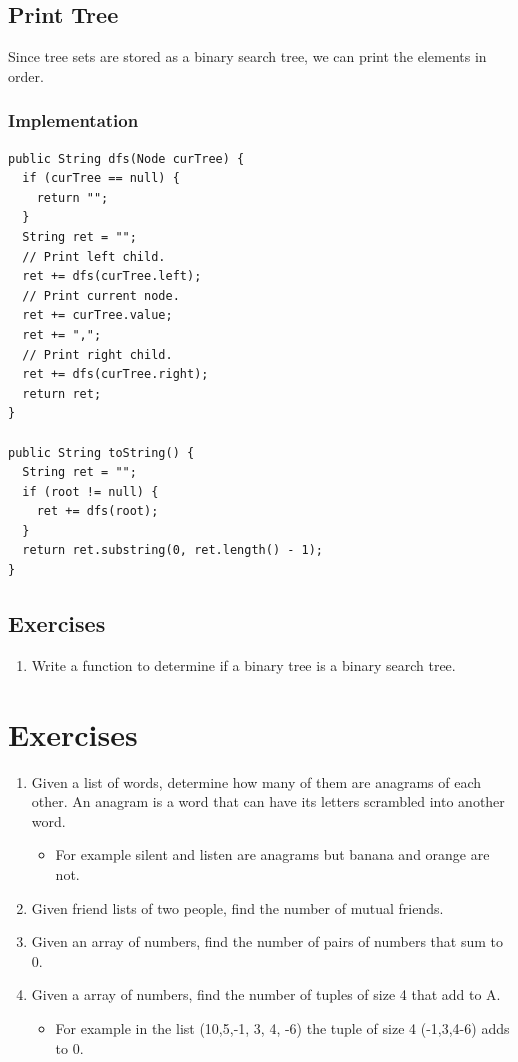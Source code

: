 \documentclass[11pt,oneside]{book}
\begin{document}
\subsection{Print Tree}

Since tree sets are stored as a binary search tree, we can print the elements in order.

\subsubsection{Implementation}

\begin{lstlisting}
public String dfs(Node curTree) {
  if (curTree == null) {
    return "";
  }
  String ret = "";
  // Print left child.
  ret += dfs(curTree.left);
  // Print current node.
  ret += curTree.value;
  ret += ",";
  // Print right child.
  ret += dfs(curTree.right);
  return ret;
}
    
public String toString() {
  String ret = "";
  if (root != null) {
    ret += dfs(root);
  }
  return ret.substring(0, ret.length() - 1);
}
\end{lstlisting}

\subsection{Exercises}

\begin{enumerate}
\item Write a function to determine if a binary tree is a binary search tree.
\end{enumerate}

        \section{ Exercises }
        

\begin{enumerate}
\item Given a list of words, determine how many of them are anagrams of each other. An anagram is a word that can have its letters scrambled into another word. 

\begin{itemize}
\item For example silent and listen are anagrams but banana and orange are not.
\end{itemize}
\item Given friend lists of two people, find the number of mutual friends.
\item Given an array of numbers, find the number of pairs of numbers that sum to 0.
\item Given a array of numbers, find the number of tuples of size 4 that add to A.

\begin{itemize}
\item For example in the list (10,5,-1, 3, 4, -6) the tuple of size 4 (-1,3,4-6) adds to 0.
\end{itemize}
\end{enumerate}
\end{document}

